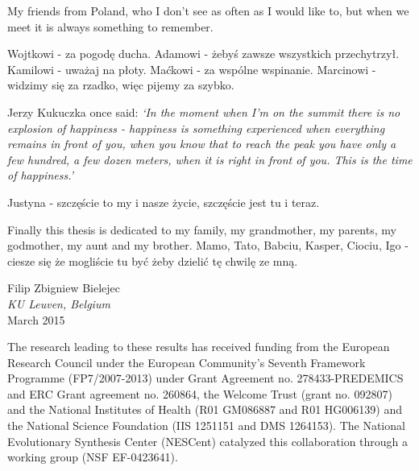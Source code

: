 My friends from Poland, who I don't see as often as I would like to, but when we meet it is always something to remember. 

Wojtkowi - za pogod\k{e} ducha. 
Adamowi - \.{z}eby\'{s} zawsze wszystkich przechytrzy\l{}.
Kamilowi - uwa\.{z}aj na p\l{}oty. 
Ma\'{c}kowi - za wsp\'{o}lne wspinanie.
Marcinowi - widzimy si\k{e} za rzadko, wi\k{e}c pijemy za szybko.


Jerzy Kukuczka once said:
\emph{`In the moment when I'm on the summit there is no explosion of happiness - happiness is something experienced when everything remains in front of you, when you know that to reach the peak you have only a few hundred, a few dozen meters, when it is right in front of you. This is the time of happiness.'} 

Justyna - szcz\k{e}\'{s}cie to my i nasze \.{z}ycie, szcz\k{e}\'{s}cie jest tu i teraz. 

Finally this thesis is dedicated to my family, my grandmother, my parents, my godmother, my aunt and my brother. 
Mamo, Tato, Babciu, Kasper, Ciociu, Igo - ciesze si\k{e} \.{z}e mogli\'{s}cie tu by\'{c} \.{z}eby
dzieli\'{c} t\k{e} chwil\k{e} ze mn\k{a}. 

\begin{flushright}
Filip Zbigniew Bielejec \\
\textit{KU Leuven, Belgium} \\
March 2015
\par\end{flushright}

\vfill{}

The research leading to these results has received funding from the European Research Council under the European Community's Seventh Framework Programme (FP7/2007-2013) under Grant Agreement no. 278433-PREDEMICS and ERC Grant agreement no. 260864, the Welcome Trust (grant no. 092807) and the National Institutes of Health (R01 GM086887 and R01 HG006139) and the National Science Foundation (IIS 1251151 and DMS 1264153).
The National Evolutionary Synthesis Center (NESCent) catalyzed this collaboration through a working group (NSF EF-0423641).
